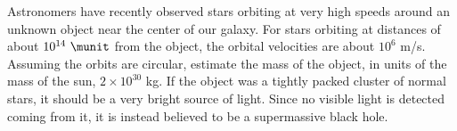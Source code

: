 Astronomers have recently observed stars orbiting at
very high speeds around an unknown object near the center of
our galaxy. For stars orbiting at distances of about
$10^{14}\ \munit$ from the object, the orbital velocities are about
$10^6$  m/s. Assuming the orbits are circular, estimate the
mass of the object, in units of the mass of the sun,
$2\times10^{30}$  kg. If the object was a tightly packed
cluster of normal stars, it should be a very bright source
of light. Since no visible light is detected coming from it,
it is instead believed to be a supermassive black hole.\answercheck
